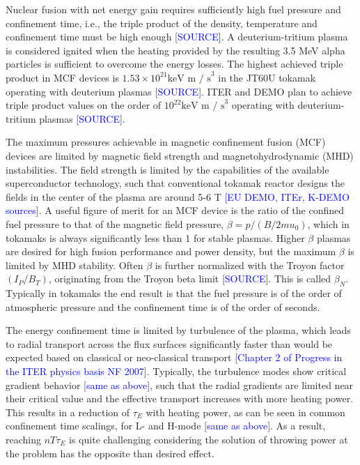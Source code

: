 \documentclass[a4paper, twoside, final, 12pt]{article}
\begin{document}
Nuclear fusion with net energy gain requires sufficiently high fuel pressure and confinement time, i.e., the triple product of the density, temperature and confinement time must be high enough [\textcolor{blue}{SOURCE}]. A deuterium-tritium plasma is considered ignited when the heating provided by the resulting 3.5 MeV alpha particles is sufficient to overcome the energy losses. 
The highest achieved triple product in MCF devices is $1.53\times 10^{21} \text{keV m / s}^3$ in the JT60U tokamak operating with deuterium plasmas [\textcolor{blue}{SOURCE}]. ITER and DEMO plan to achieve triple product values on the order of $10^{22}\text{keV m / s}^3$ operating with deuterium-tritium plasmas [\textcolor{blue}{SOURCE}].

The maximum pressures achievable in magnetic confinement fusion (MCF) devices are limited by magnetic field strength and magnetohydrodynamic (MHD) instabilities.
The field strength is limited by the capabilities of the available superconductor technology, such that conventional tokamak reactor designs the fields in the center of the plasma are around 5-6 T \textcolor{blue}{[EU DEMO, ITEr, K-DEMO sources]}. A useful figure of merit for an MCF device is the ratio of the confined fuel pressure to that of the magnetic field pressure, $\beta = p / (B/2mu_0)$, which in tokamaks is always significantly less than 1 for stable plasmas. Higher $\beta$ plasmas are desired for high fusion performance and power density, but the maximum $\beta$ is limited by MHD stability. Often $\beta$ is further normalized with the Troyon factor $(I_P / B_T)$, originating from the Troyon beta limit [\textcolor{blue}{SOURCE}]. This is called $\beta_N$. Typically in tokamaks the end result is that the fuel pressure is of the order of atmospheric pressure and the confinement time is of the order of seconds. 


The energy confinement time is limited by turbulence of the plasma, which leads to radial transport across the flux surfaces significantly faster than would be expected based on classical or neo-classical transport [\textcolor{blue}{Chapter 2 of Progress in the ITER physics basis NF 2007}].
Typically, the turbulence modes show critical gradient behavior [\textcolor{blue}{same as above}], such that the radial gradients are limited near their critical value and the effective transport increases with more heating power.
This results in a reduction of $\tau_E$ with heating power, as can be seen in common confinement time scalings, for L- and H-mode [\textcolor{blue}{same as above}]. As a result, reaching $nT\tau_E$ is quite challenging considering the solution of throwing power at the problem has the opposite than desired effect.
\end{document}
